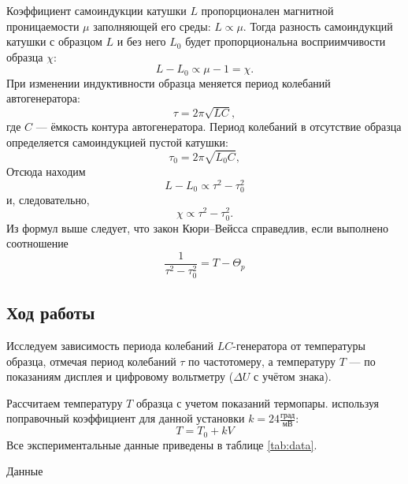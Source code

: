 \documentclass[12pt,a4paper]{article}
\begin{document}
Коэффициент самоиндукции катушки $L$ пропорционален магнитной
проницаемости $\mu$ заполняющей его среды: $L \propto \mu$. Тогда разность самоиндукций катушки с образцом $L$ и без него $L_0$ будет пропорциональна восприимчивости образца $\chi$:
$$L - L_0 \propto \mu - 1 = \chi .$$
При изменении индуктивности образца меняется период колебаний автогенератора:
$$\tau = 2\pi \sqrt{LC},$$
где $C$ — ёмкость контура автогенератора. Период колебаний в отсутствие
образца определяется самоиндукцией пустой катушки:
$$\tau_0 = 2\pi \sqrt{L_0C},$$
Отсюда находим
$$L - L_0 \propto \tau^2 - \tau_0^2$$
и, следовательно,
$$\chi \propto \tau^2 - \tau_0^2.$$
Из формул выше следует, что закон Кюри–Вейсса справедлив, если выполнено соотношение
$$\frac{1}{\tau^2 - \tau_0^2} = T - \Theta_p$$

\subsection*{Ход работы}

Исследуем зависимость периода колебаний $LC$-генератора от температуры образца, отмечая период колебаний $\tau$ по частотомеру, а температуру $T$ — по показаниям дисплея и цифровому вольтметру ($\Delta U$ с учётом знака).

Рассчитаем температуру $T$ образца с учетом показаний термопары. используя поправочный коэффициент для данной установки $k = 24 \frac{\text{град}}{\text{мВ}}$:
$$T = T_0 + k V$$
Все экспериментальные данные приведены в таблице \ref{tab:data}.

\begin{table}[H]
	\footnotesize
	
	\caption{Данные}
	\label{tab:data}
\end{table}

\begin{figure}[htb]
	\centering
{}%
\end{figure}
\end{document}
